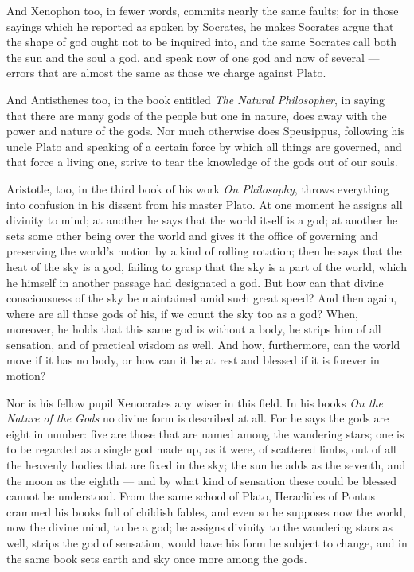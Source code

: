  And Xenophon too, in fewer words, commits nearly the same faults; for in those sayings which he reported as spoken by Socrates, he makes Socrates argue that the shape of god ought not to be inquired into, and the same Socrates call both the sun and the soul a god, and speak now of one god and now of several — errors that are almost the same as those we charge against Plato.

 And Antisthenes too, in the book entitled \textit{The Natural Philosopher}, in saying that there are many gods of the people but one in nature, does away with the power and nature of the gods. Nor much otherwise does Speusippus, following his uncle Plato and speaking of a certain force by which all things are governed, and that force a living one, strive to tear the knowledge of the gods out of our souls.

 Aristotle, too, in the third book of his work \textit{On Philosophy}, throws everything into confusion in his dissent from his master Plato. At one moment he assigns all divinity to mind; at another he says that the world itself is a god; at another he sets some other being over the world and gives it the office of governing and preserving the world's motion by a kind of rolling rotation; then he says that the heat of the sky is a god, failing to grasp that the sky is a part of the world, which he himself in another passage had designated a god. But how can that divine consciousness of the sky be maintained amid such great speed? And then again, where are all those gods of his, if we count the sky too as a god? When, moreover, he holds that this same god is without a body, he strips him of all sensation, and of practical wisdom as well. And how, furthermore, can the world move if it has no body, or how can it be at rest and blessed if it is forever in motion?

 Nor is his fellow pupil Xenocrates any wiser in this field. In his books \textit{On the Nature of the Gods} no divine form is described at all. For he says the gods are eight in number: five are those that are named among the wandering stars; one is to be regarded as a single god made up, as it were, of scattered limbs, out of all the heavenly bodies that are fixed in the sky; the sun he adds as the seventh, and the moon as the eighth — and by what kind of sensation these could be blessed cannot be understood. From the same school of Plato, Heraclides of Pontus crammed his books full of childish fables, and even so he supposes now the world, now the divine mind, to be a god; he assigns divinity to the wandering stars as well, strips the god of sensation, would have his form be subject to change, and in the same book sets earth and sky once more among the gods.

